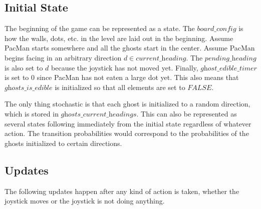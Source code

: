 \documentclass[paper=a4, fontsize=11pt]{scrartcl}
\begin{document}
\subsection{Initial State}

The beginning of the game can be represented as a state. The $\textit{board\_config}$ is how the walls, dots, etc. in the level are laid out in the beginning. Assume PacMan starts somewhere and all the ghosts start in the center. Assume PacMan begins facing in an arbitrary direction $d \in \textit{current\_heading}$. The $\textit{pending\_heading}$ is also set to $d$ because the joystick has not moved yet. Finally, $\textit{ghost\_edible\_timer}$ is set to $0$ since PacMan has not eaten a large dot yet. This also means that $\textit{ghosts\_is\_edible}$ is initialized so that all elements are set to $FALSE$.

The only thing stochastic is that each ghost is initialized to a random direction, which is stored in $\textit{ghosts\_current\_headings}$. This can also be represented as several states following immediately from the initial state regardless of whatever action. The transition probabilities would correspond to the probabilities of the ghosts initialized to certain directions.

\subsection{Updates}

The following updates happen after any kind of action is taken, whether the joystick moves or the joystick is not doing anything.
\end{document}

